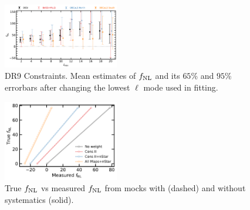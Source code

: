 \begin{figure}
    \centering
    \includegraphics[width=0.45\textwidth]{figures/fnl_elmin.pdf}     
    \caption{DR9 Constraints. Mean estimates of $f_{\rm NL}$ and its $65$\% and $95$\% errorbars after changing the lowest $\ell$ mode used in fitting.}\label{fig:mcmc_dr9elmin}
\end{figure}


\begin{figure}
\centering
\includegraphics[width=0.45\textwidth]{figures/fnlbias}
\caption{True $f_{\rm NL}$ vs measured $f_{\rm NL}$ from mocks with (dashed) and without systematics (solid).}
\end{figure}